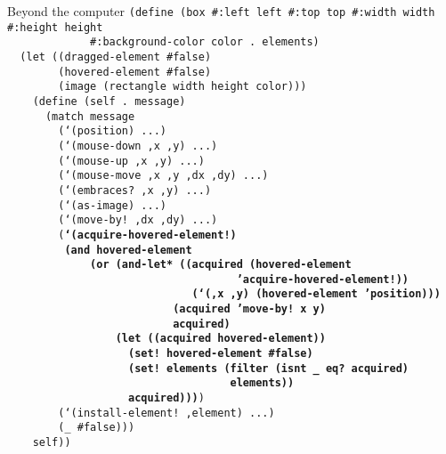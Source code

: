\begin{frame}{Beyond the computer}
  \tiny
  \texttt{(define (box \#:left left \#:top top \#:width width \#:height height\\
    \ \ \ \ \ \ \ \ \ \ \ \ \ \#:background-color color .\ elements)\\
    \ \ (let ((dragged-element \#false)\\
    \ \ \ \ \ \ \ \ (hovered-element \#false)\\
    \ \ \ \ \ \ \ \ (image (rectangle width height color)))\\
    \ \ \ \ (define (self .\ message)\\
    \ \ \ \ \ \ (match message\\
    \ \ \ \ \ \ \ \ (`(position) ...)\\
    \ \ \ \ \ \ \ \ (`(mouse-down ,x ,y) ...)\\
    \ \ \ \ \ \ \ \ (`(mouse-up ,x ,y) ...)\\
    \ \ \ \ \ \ \ \ (`(mouse-move ,x ,y ,dx ,dy) ...)\\
    \ \ \ \ \ \ \ \ (`(embraces?\ ,x ,y) ...)\\
    \ \ \ \ \ \ \ \ (`(as-image) ...)\\
    \ \ \ \ \ \ \ \ (`(move-by!\ ,dx ,dy) ...)\\
    \ \ \ \ \ \ \ \ (\textbf{`(acquire-hovered-element!)\\
    \ \ \ \ \ \ \ \ \ (and hovered-element\\
    \ \ \ \ \ \ \ \ \ \ \ \ \ (or (and-let* ((acquired (hovered-element\\
    \ \ \ \ \ \ \ \ \ \ \ \ \ \ \ \ \ \ \ \ \ \ \ \ \ \ \ \ \ \ \ \ \ \ \ \ 'acquire-hovered-element!))\\
    \ \ \ \ \ \ \ \ \ \ \ \ \ \ \ \ \ \ \ \ \ \ \ \ \ \ \ \ \ (`(,x ,y) (hovered-element 'position)))\\
    \ \ \ \ \ \ \ \ \ \ \ \ \ \ \ \ \ \ \ \ \ \ \ \ \ \ (acquired 'move-by!\ x y)\\
    \ \ \ \ \ \ \ \ \ \ \ \ \ \ \ \ \ \ \ \ \ \ \ \ \ \ acquired)\\
    \ \ \ \ \ \ \ \ \ \ \ \ \ \ \ \ \ (let ((acquired hovered-element))\\
    \ \ \ \ \ \ \ \ \ \ \ \ \ \ \ \ \ \ \ (set!\ hovered-element \#false)\\
    \ \ \ \ \ \ \ \ \ \ \ \ \ \ \ \ \ \ \ (set!\ elements (filter (isnt \_ eq?\ acquired)\\
    \ \ \ \ \ \ \ \ \ \ \ \ \ \ \ \ \ \ \ \ \ \ \ \ \ \ \ \ \ \ \ \ \ \ \ elements))\\
    \ \ \ \ \ \ \ \ \ \ \ \ \ \ \ \ \ \ \ acquired)))})\\
    \ \ \ \ \ \ \ \ (`(install-element!\ ,element) ...)\\
    \ \ \ \ \ \ \ \ (\_ \#false)))\\
    \ \ \ \ self))}
\end{frame}


